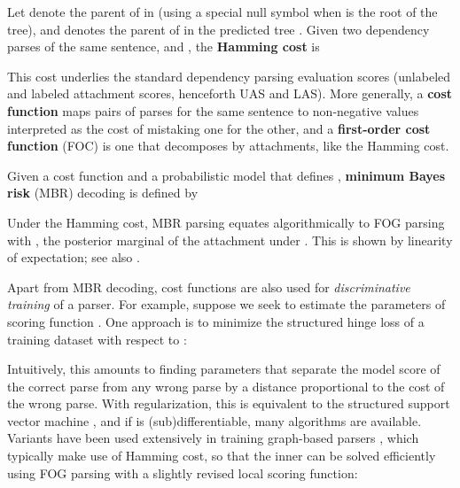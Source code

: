 \documentclass[11pt,letterpaper]{article}
\newcommand{\ignore}[1]{}
\newcommand{\adhicomment}[1]{\ignore{\textcolor{green}{{\textbf{[#1 --\textsc{adhi}]}}}}}
\newcommand{\lingpengcomment}[1]{\ignore{\textcolor{green}{{\textbf{[#1 --\textsc{lpk}]}}}}}
\newcommand{\nascomment}[1]{\ignore{\textcolor{blue}{{\textbf{[#1 --\textsc{nas}]}}}}}
\begin{document}
Let  denote the parent of  in  (using a special null symbol when  is the root of the tree), and  denotes the parent of  in the predicted tree . Given two dependency parses of the same sentence,  and , the \textbf{Hamming cost}  is 

\ignore{\lingpengcomment{I don't quite like the expension of the equation... took me a while to understand...the  notation is confusing. maybe use  and indiction function?}\adhicomment{Addressed}}This cost underlies the standard dependency parsing evaluation scores (unlabeled and labeled attachment scores, henceforth UAS and LAS).  More generally, a \textbf{cost function}  maps pairs of parses for the same sentence to non-negative values interpreted as the cost of mistaking one for the other, and a \textbf{first-order cost function} (FOC) is one that decomposes by attachments, like the Hamming cost.


Given a cost function  and a probabilistic model that defines , \textbf{minimum Bayes risk} (MBR) decoding is defined by

Under the Hamming cost, MBR parsing equates algorithmically to FOG parsing with , the posterior marginal of the attachment under .  This is shown by linearity of expectation; see also .

Apart from MBR decoding, cost functions are also used for \emph{discriminative training} \ignore{\adhicomment{can we say that this is a non-probabilistic use of cost?} use of cost functions is in \textbf{discriminative training} \adhicomment{R2 says that this part is confusing and that we should elaborate more what we mean by 'a rather different use of cost function'}}of a parser.  For example, suppose we seek to estimate the parameters  of scoring function .  One approach is to minimize the structured hinge loss of a training dataset  with respect to :


\ignore{\lingpengcomment{I put the neg first... I think this way is clear in format, if it is impossible to put everything in a single line.}}
Intuitively, this amounts to finding parameters that separate the model score of the correct parse from any wrong parse by a distance proportional to the cost of the wrong parse.
With regularization, this is equivalent to the structured support vector machine \cite{taskar,tsochantaridis}, \ignore{\nascomment{missing cites}}and if  is (sub)differentiable, many algorithms are available.
Variants have been used extensively in training graph-based parsers \cite{nonprojective_mcdonald,martins-09}, which typically
make use of Hamming cost, so that the inner  can be solved efficiently using FOG parsing with a slightly revised local scoring function:
\end{document}
